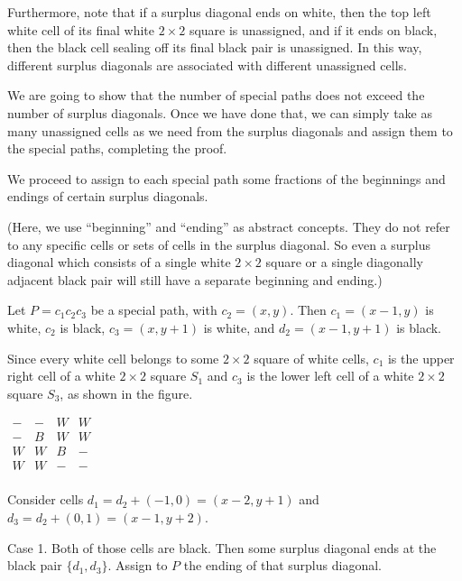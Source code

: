 \documentclass{article}
\begin{document}
Furthermore, note that if a surplus diagonal ends on white, then the top left white cell of its final white \(\displaystyle 2 \times 2\) square is unassigned, and if it ends on black, then the black cell sealing off its final black pair is unassigned. In this way, different surplus diagonals are associated with different unassigned cells.

We are going to show that the number of special paths does not exceed the number of surplus diagonals. Once we have done that, we can simply take as many unassigned cells as we need from the surplus diagonals and assign them to the special paths, completing the proof.

We proceed to assign to each special path some fractions of the beginnings and endings of certain surplus diagonals.

(Here, we use ``beginning'' and ``ending'' as abstract concepts. They do not refer to any specific cells or sets of cells in the surplus diagonal. So even a surplus diagonal which consists of a single white \(\displaystyle 2 \times 2\) square or a single diagonally adjacent black pair will still have a separate beginning and ending.)

Let \(\displaystyle P = c_1 c_2 c_3\) be a special path, with \(\displaystyle c_2 = (x, y)\). Then \(\displaystyle c_1 = (x - 1, y)\) is white, \(\displaystyle c_2\) is black, \(\displaystyle c_3 = (x, y + 1)\) is white, and \(\displaystyle d_2 = (x - 1, y + 1)\) is black.

Since every white cell belongs to some \(\displaystyle 2 \times 2\) square of white cells, \(\displaystyle c_1\) is the upper right cell of a white \(\displaystyle 2 \times 2\) square \(\displaystyle S_1\) and \(\displaystyle c_3\) is the lower left cell of a white \(\displaystyle 2 \times 2\) square \(\displaystyle S_3\), as shown in the figure.

\(\displaystyle \begin{matrix}
     -& -& W& W\\
     -& B& W& W\\
     W& W& B& -\\
     W& W& -& -\\
\end{matrix}\)

Consider cells \(\displaystyle d_1 = d_2 + (-1, 0) = (x - 2, y + 1)\) and \(\displaystyle d_3 = d_2 + (0, 1) = (x - 1, y + 2)\).

Case 1. Both of those cells are black. Then some surplus diagonal ends at the black pair \(\displaystyle \{d_1, d_3\}\). Assign to \(\displaystyle P\) the ending of that surplus diagonal.
\end{document}
